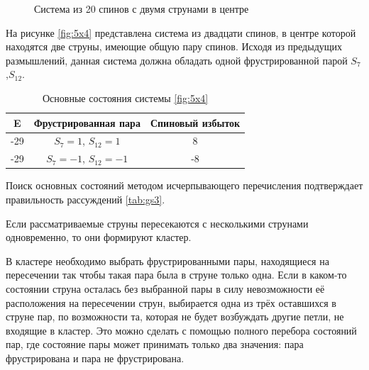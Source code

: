 \documentclass[utf8, babel, sor, jor, amsmath,amssymb, reprint]{elsarticle} %
\begin{document}
\begin{figure}[h]
	\centering
	\caption{Система из 20 спинов с двумя струнами в центре}
	\label{fig:5x4}
\end{figure}

На рисунке \eqref{fig:5x4} представлена система из двадцати спинов, в центре которой находятся две струны, имеющие общую пару спинов. Исходя из предыдущих размышлений, данная система должна обладать одной фрустрированной парой  $S_7$,$S_12$.

\begin{table}[h]
	\centering
	\begin{tabular}{|c|c|c|}
		\hline
		E   &   Фрустрированная пара & Спиновый избыток\\
		\hline
		-29   &  $S_7=1$, $S_{12}=1$ & 8 \\
		\hline
		-29   &   $S_7=-1$, $S_{12}=-1$ & -8 \\
		\hline
	\end{tabular}
	\caption{Основные состояния системы \eqref{fig:5x4}}
	\label{tab:gs3}
\end{table}

Поиск основных состояний методом исчерпывающего перечисления подтверждает правильность рассуждений \eqref{tab:gs3}.

Если рассматриваемые струны пересекаются с несколькими струнами одновременно, то они формируют кластер.

В кластере необходимо выбрать фрустрированными пары, находящиеся на пересечении так чтобы такая пара была в струне только одна. Если в каком-то состоянии струна осталась без выбранной пары в силу невозможности её расположения на пересечении струн, выбирается одна из трёх оставшихся в струне пар, по возможности та, которая не будет возбуждать другие петли, не входящие в кластер. Это можно сделать с помощью полного перебора состояний пар, где состояние пары может принимать только два значения: пара фрустрирована и пара не фрустрирована.
\end{document}
